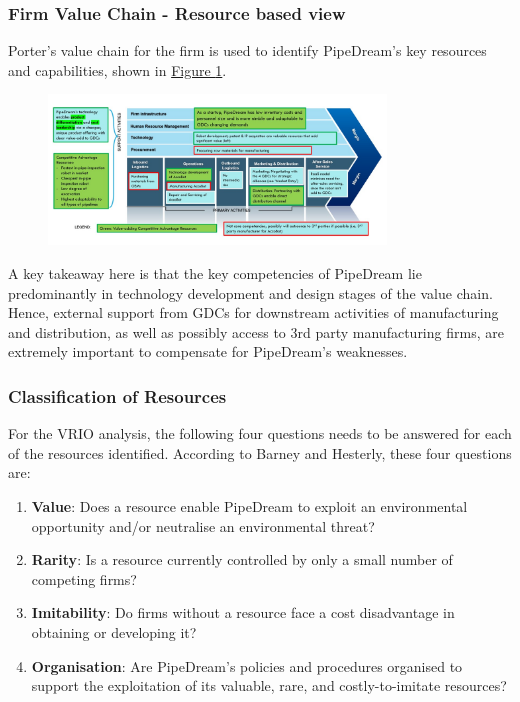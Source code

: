 \documentclass[11pt]{article}		%
\newcommand{\figref}[1]{\hyperref[#1]{Figure \ref*{#1}}}    %
\begin{document}
	\subsubsection[Firm Value Chain]{Firm Value Chain - Resource based view}\label{valueChainanal}
 Porter's value chain for the firm is used to identify PipeDream's key resources and capabilities, shown in \figref{valueChain}. 
 
                \begin{figure}[H]
    					\centering
        					\includegraphics[width=0.8\textwidth]{valuechain.jpg}
        					\label{valueChain}
			    \end{figure}
 
	\hspace*{3ex} A key takeaway here is that the key competencies of PipeDream lie predominantly in technology development and design stages of the value chain. Hence, external support from GDCs for downstream activities of manufacturing and distribution, as well as possibly access to 3rd party manufacturing firms, are extremely important to compensate for PipeDream's weaknesses. 

	
	\subsubsection{Classification of Resources}
    For the VRIO analysis, the following four questions needs to be answered for each of the resources identified. According to Barney and Hesterly, these four questions are:
        \begin{enumerate}
        \item \textbf{Value}: Does a resource enable PipeDream to exploit an environmental opportunity and/or neutralise an environmental threat?
        \item \textbf{Rarity}: Is a resource currently controlled by only a small number of competing firms?
        \item \textbf{Imitability}: Do firms without a resource face a cost disadvantage in obtaining or developing it?
        \item \textbf{Organisation}: Are PipeDream’s policies and procedures organised to support the exploitation of its valuable, rare, and costly-to-imitate resources?
    \end{enumerate}
    
\end{document}
